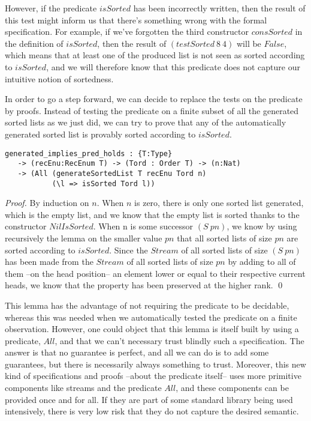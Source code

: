 However, if the predicate $isSorted$ has been incorrectly written, then the result of this test might inform us that there's something wrong with the formal specification. For example, if we've forgotten the third constructor $consSorted$ in the definition of $isSorted$, then the result of $(testSorted\ 8\ 4)$ will be $False$, which means that at least one of the produced list is not seen as sorted according to $isSorted$, and we will therefore know that this predicate  does not capture our intuitive notion of sortedness.

In order to go a step forward, we can decide to replace the tests on the predicate by proofs. Instead of testing the predicate on a finite subset of all the generated sorted lists as we just did, we can try to prove that any of the automatically generated sorted list is provably sorted according to $isSorted$.

\begin{lstlisting}
generated_implies_pred_holds : {T:Type} 
   -> (recEnu:RecEnum T) -> (Tord : Order T) -> (n:Nat) 
   -> (All (generateSortedList T recEnu Tord n) 
           (\l => isSorted Tord l))
\end{lstlisting}
\begin{proof}
By induction on $n$.
When $n$ is zero, there is only one sorted list generated, which is the empty list, and we know that the empty list is sorted thanks to the constructor $NilIsSorted$. When n is some successor $(S\ pn)$, we know by using recursively the lemma on the smaller value $pn$ that all sorted lists of size $pn$ are sorted according to $isSorted$. Since the $Stream$ of all sorted lists of size $(S\ pn)$ has been made from the $Stream$ of all sorted lists of size $pn$ by adding to all of them --on the head position-- an element lower or equal to their respective current heads, we know that the property has been preserved at the higher rank.
\qed
\end{proof}

This lemma has the advantage of not requiring the predicate to be decidable, whereas this was needed when we automatically tested the predicate on a finite observation. However, one could object that this lemma is itself built by using a predicate, $All$, and that we can't necessary trust blindly such a specification. The answer is that no guarantee is perfect, and all we can do is to add some guarantees, but there is necessarily always something to trust. Moreover, this new kind of specifications and proofs --about the predicate itself-- uses more primitive components like streams and the predicate $All$, and these components can be provided once and for all. If they are part of some standard library being used intensively, there is very low risk that they do not capture the desired semantic.


